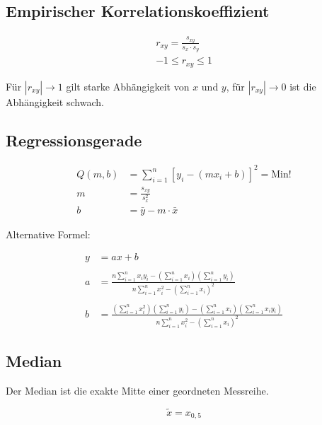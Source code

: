 \subsection{Empirischer Korrelationskoeffizient}
\begin{align*}
	r_{xy} = \frac{s_{xy}}{s_x \cdot s_y}\\
	-1 \leq r_{xy} \leq 1
\end{align*}

Für $|r_{xy}|\rightarrow 1$ gilt starke Abhängigkeit von $x$ und $y$, für $|r_{xy}|\rightarrow 0$ ist die Abhängigkeit schwach.

\subsection{Regressionsgerade}
\begin{align*}
	Q(m,b) &= \sum_{i=1}^{n}\left[y_i-(mx_i+b)\right]^2=\text{Min!}\\
	m &= \frac{s_{xy}}{s_x^2}\\
	b &= \bar{y}-m\cdot\bar{x}
\end{align*}

Alternative Formel:

\begin{align*}
	y &= ax+b\\
\\
	a &= \frac{n \sum\limits_{i=1}^{n} x_i y_i - \left( \sum\limits_{i=1}^{n} x_i \right) \left( \sum\limits_{i=1}^{n} y_i \right)}
		{n \sum\limits_{i=1}^{n} x_i^2 - \left( \sum\limits_{i=1}^{n} x_i \right)^2}\\
\\
	b &= \frac{\left( \sum\limits_{i=1}^{n} x_i^2 \right) \left( \sum\limits_{i=1}^{n} y_i \right)-
		\left( \sum\limits_{i=1}^{n} x_i \right) \left( \sum\limits_{i=1}^{n} x_i y_i \right)}
		{n \sum\limits_{i=1}^{n} x_i^2- \left( \sum\limits_{i=1}^{n} x_i \right)^2}
\end{align*}

\subsection{Median}
Der Median ist die exakte Mitte einer geordneten Messreihe.

\begin{equation*}
	\tilde{x} = x_{0,5}
\end{equation*}
